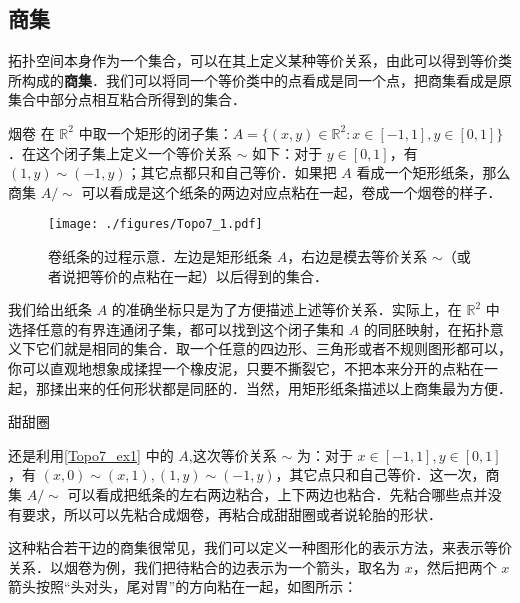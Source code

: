 

\subsection{商集}

拓扑空间本身作为一个集合，可以在其上定义某种等价关系，由此可以得到等价类所构成的\textbf{商集}．我们可以将同一个等价类中的点看成是同一个点，把商集看成是原集合中部分点相互粘合所得到的集合．

\begin{example}{烟卷}\label{Topo7_ex1}
在 $\mathbb{R}^2$ 中取一个矩形的闭子集：$A=\{(x,y)\in\mathbb{R}^2:x\in[-1,1],y\in[0,1]\}$．在这个闭子集上定义一个等价关系 $\sim$ 如下：对于 $y\in[0,1]$，有 $(1, y)\sim(-1, y)$；其它点都只和自己等价．如果把 $A$ 看成一个矩形纸条，那么商集 $A/\sim$ 可以看成是这个纸条的两边对应点粘在一起，卷成一个烟卷的样子．

\begin{figure}[ht]
\centering
\texttt{[image: ./figures/Topo7\_1.pdf]}
\caption{卷纸条的过程示意．左边是矩形纸条 $A$，右边是模去等价关系 $\sim$（或者说把等价的点粘在一起）以后得到的集合．} \label{Topo7_fig1}
\end{figure}

\end{example}



我们给出纸条 $A$ 的准确坐标只是为了方便描述上述等价关系．实际上，在 $\mathbb{R}^2$ 中选择任意的有界连通闭子集，都可以找到这个闭子集和 $A$ 的同胚映射，在拓扑意义下它们就是相同的集合．取一个任意的四边形、三角形或者不规则图形都可以，你可以直观地想象成揉捏一个橡皮泥，只要不撕裂它，不把本来分开的点粘在一起，那揉出来的任何形状都是同胚的．当然，用矩形纸条描述以上商集最为方便．

\begin{example}{甜甜圈}

还是利用\autoref{Topo7_ex1} 中的 $A$,这次等价关系 $\sim$ 为：对于 $x\in[-1,1], y\in[0,1]$，有 $(x,0)\sim(x,1), (1, y)\sim(-1, y)$，其它点只和自己等价．这一次，商集 $A/\sim$ 可以看成把纸条的左右两边粘合，上下两边也粘合．先粘合哪些点并没有要求，所以可以先粘合成烟卷，再粘合成甜甜圈或者说轮胎的形状．

\end{example}

这种粘合若干边的商集很常见，我们可以定义一种图形化的表示方法，来表示等价关系．以烟卷为例，我们把待粘合的边表示为一个箭头，取名为 $x$，然后把两个 $x$ 箭头按照“头对头，尾对胃”的方向粘在一起，如图所示：

